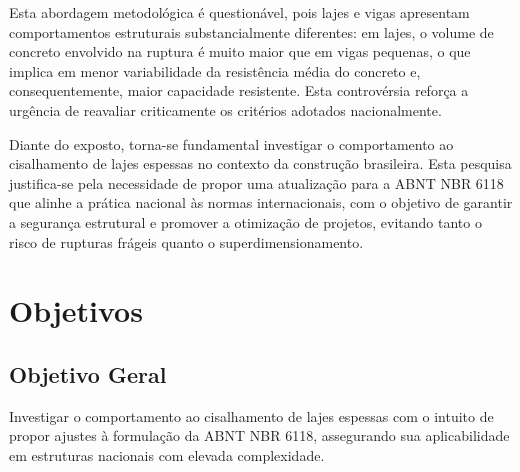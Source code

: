 Esta abordagem metodológica é questionável, pois lajes e vigas apresentam comportamentos estruturais substancialmente diferentes: em lajes, o volume de concreto envolvido na ruptura é muito maior que em vigas pequenas, o que implica em menor variabilidade da resistência média do concreto e, consequentemente, maior capacidade resistente. Esta controvérsia reforça a urgência de reavaliar criticamente os critérios adotados nacionalmente.

Diante do exposto, torna-se fundamental investigar o comportamento ao cisalhamento de lajes espessas no contexto da construção brasileira. Esta pesquisa justifica-se pela necessidade de propor uma atualização para a ABNT NBR 6118 que alinhe a prática nacional às normas internacionais, com o objetivo de garantir a segurança estrutural e promover a otimização de projetos, evitando tanto o risco de rupturas frágeis quanto o superdimensionamento.



\chapter{Objetivos}
\section{Objetivo Geral}

Investigar o comportamento ao cisalhamento de lajes espessas com o intuito de propor ajustes à formulação da ABNT NBR 6118, assegurando sua aplicabilidade em estruturas nacionais com elevada complexidade.

